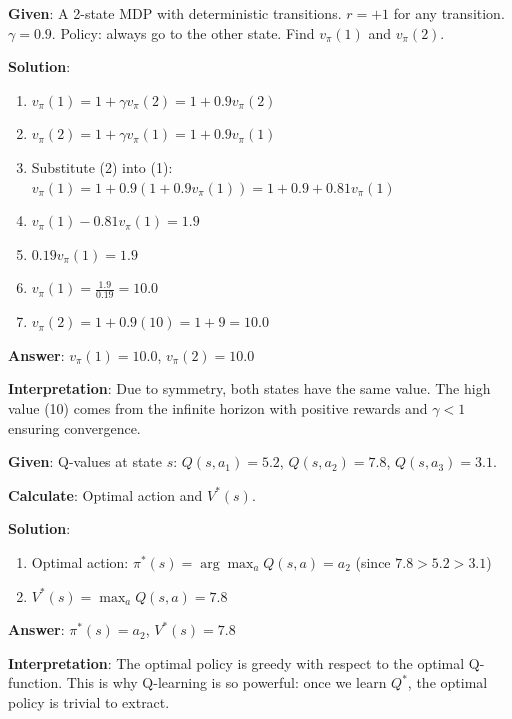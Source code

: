 \documentclass[11pt,a4paper]{article}
\begin{document}
\begin{tcolorbox}[colback=green!5!white,colframe=green!75!black,title=\textbf{Worked Example 23: Solving a Simple Bellman Equation}]
\textbf{Given}: A 2-state MDP with deterministic transitions. $r = +1$ for any transition. $\gamma = 0.9$. Policy: always go to the other state. Find $v_\pi(1)$ and $v_\pi(2)$.

\textbf{Solution}:
\begin{enumerate}
    \item $v_\pi(1) = 1 + \gamma v_\pi(2) = 1 + 0.9 v_\pi(2)$
    \item $v_\pi(2) = 1 + \gamma v_\pi(1) = 1 + 0.9 v_\pi(1)$
    \item Substitute (2) into (1): $v_\pi(1) = 1 + 0.9(1 + 0.9 v_\pi(1)) = 1 + 0.9 + 0.81 v_\pi(1)$
    \item $v_\pi(1) - 0.81 v_\pi(1) = 1.9$
    \item $0.19 v_\pi(1) = 1.9$
    \item $v_\pi(1) = \frac{1.9}{0.19} = 10.0$
    \item $v_\pi(2) = 1 + 0.9(10) = 1 + 9 = 10.0$
\end{enumerate}

\textbf{Answer}: $v_\pi(1) = 10.0$, $v_\pi(2) = 10.0$

\textbf{Interpretation}: Due to symmetry, both states have the same value. The high value (10) comes from the infinite horizon with positive rewards and $\gamma < 1$ ensuring convergence.
\end{tcolorbox}

\begin{tcolorbox}[colback=green!5!white,colframe=green!75!black,title=\textbf{Worked Example 24: Optimal Policy Selection from Q-Values}]
\textbf{Given}: Q-values at state $s$: $Q(s, a_1) = 5.2$, $Q(s, a_2) = 7.8$, $Q(s, a_3) = 3.1$.

\textbf{Calculate}: Optimal action and $V^*(s)$.

\textbf{Solution}:
\begin{enumerate}
    \item Optimal action: $\pi^*(s) = \arg\max_a Q(s, a) = a_2$ (since $7.8 > 5.2 > 3.1$)
    \item $V^*(s) = \max_a Q(s, a) = 7.8$
\end{enumerate}

\textbf{Answer}: $\pi^*(s) = a_2$, $V^*(s) = 7.8$

\textbf{Interpretation}: The optimal policy is greedy with respect to the optimal Q-function. This is why Q-learning is so powerful: once we learn $Q^*$, the optimal policy is trivial to extract.
\end{tcolorbox}
\end{document}
